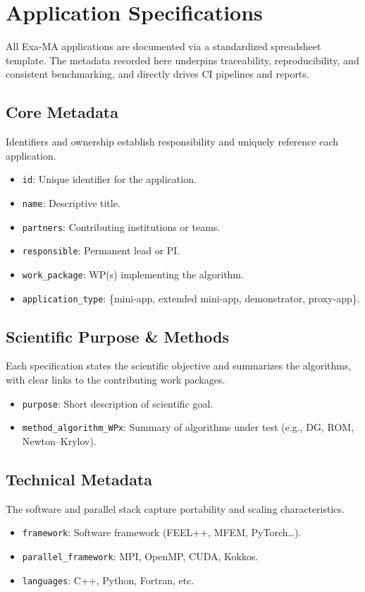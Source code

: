 \section{Application Specifications}
\label{sec:apps-specs}

All Exa‑MA applications are documented via a standardized spreadsheet template. The metadata recorded here underpins traceability, reproducibility, and consistent benchmarking, and directly drives CI pipelines and reports.

\subsection{Core Metadata}
Identifiers and ownership establish responsibility and uniquely reference each application.
\begin{itemize}
  \item \texttt{id}: Unique identifier for the application.  
  \item \texttt{name}: Descriptive title.  
  \item \texttt{partners}: Contributing institutions or teams.  
  \item \texttt{responsible}: Permanent lead or PI.  
  \item \texttt{work\_package}: WP(s) implementing the algorithm.  
  \item \texttt{application\_type}: \{mini-app, extended mini-app, demonstrator, proxy-app\}.
\end{itemize}

\subsection{Scientific Purpose \& Methods}
Each specification states the scientific objective and summarizes the algorithms, with clear links to the contributing work packages.
\begin{itemize}
  \item \texttt{purpose}: Short description of scientific goal.  
  \item \texttt{method\_algorithm\_WPx}: Summary of algorithms under test (e.g., DG, ROM, Newton–Krylov).
\end{itemize}

\subsection{Technical Metadata}
The software and parallel stack capture portability and scaling characteristics.
\begin{itemize}
  \item \texttt{framework}: Software framework (FEEL++, MFEM, PyTorch…).  
  \item \texttt{parallel\_framework}: MPI, OpenMP, CUDA, Kokkos.  
  \item \texttt{languages}: C++, Python, Fortran, etc.
\end{itemize}

